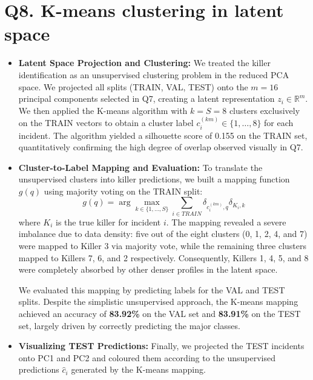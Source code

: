 \documentclass{article}
\begin{document}
\section*{Q8. K-means clustering in latent space}
\begin{itemize}
\item \textbf{Latent Space Projection and Clustering:}
We treated the killer identification as an unsupervised clustering problem in the reduced PCA space. We projected all splits (TRAIN, VAL, TEST) onto the $m=16$ principal components selected in Q7, creating a latent representation $z_{i}\in\mathbb{R}^{m}$. We then applied the K-means algorithm with $k=S=8$ clusters exclusively on the TRAIN vectors to obtain a cluster label $c_{i}^{(km)}\in\{1,\dots,8\}$ for each incident. The algorithm yielded a silhouette score of 0.155 on the TRAIN set, quantitatively confirming the high degree of overlap observed visually in Q7.

\item \textbf{Cluster-to-Label Mapping and Evaluation:}
To translate the unsupervised clusters into killer predictions, we built a mapping function $g(q)$ using majority voting on the TRAIN split:
\begin{equation}
    g(q) = \arg\max_{k\in\{1,\dots,S\}} \sum_{i\in TRAIN}\delta_{c_{i}^{(km)},q}\delta_{K_{i},k}
\end{equation}
where $K_{i}$ is the true killer for incident $i$. The mapping revealed a severe imbalance due to data density: five out of the eight clusters (0, 1, 2, 4, and 7) were mapped to Killer 3 via majority vote, while the remaining three clusters mapped to Killers 7, 6, and 2 respectively. Consequently, Killers 1, 4, 5, and 8 were completely absorbed by other denser profiles in the latent space.

We evaluated this mapping by predicting labels for the VAL and TEST splits. Despite the simplistic unsupervised approach, the K-means mapping achieved an accuracy of \textbf{83.92\%} on the VAL set and \textbf{83.91\%} on the TEST set, largely driven by correctly predicting the major classes.

\item \textbf{Visualizing TEST Predictions:}
Finally, we projected the TEST incidents onto PC1 and PC2 and coloured them according to the unsupervised predictions $\hat{c}_{i}$ generated by the K-means mapping.


\end{itemize}
\end{document}

